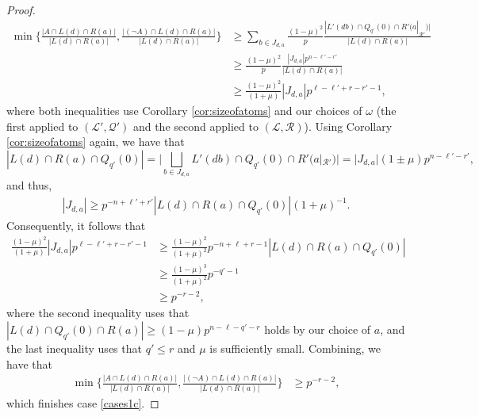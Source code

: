 \documentclass[12pt,oneside,british,a4wide]{amsart}
\numberwithin{equation}{section}
\theoremstyle{definition}
\newcommand{\calL}{\mathcal{L}}
\newcommand{\calQ}{\mathcal{Q}}
\newcommand{\calR}{\mathcal{R}}
\begin{document}
\begin{proof}
 \begin{align*}
\min\Big\{\frac{|A\cap L(d)\cap R(a)|}{|L(d)\cap R(a)|},\frac{|(\neg A)\cap L(d)\cap R(a)|}{|L(d)\cap R(a)|}\Big\}&\geq \sum_{b\in J_{d,a}}\frac{(1-\mu)^2}{p}\frac{|L'(db)\cap Q_{q'}(0)\cap R'(a|_{\calR'})|}{|L(d)\cap R(a)|}\\ 
&\geq \frac{(1-\mu)^2}{p}\frac{|J_{d,a}|p^{n-\ell'-r'}}{|L(d)\cap R(a)|}\\
&\geq  \frac{(1-\mu)^2}{(1+\mu)} |J_{d,a}|p^{\ell-\ell'+r-r'-1},
\end{align*}
where both inequalities use Corollary \ref{cor:sizeofatoms} and our choices of $\omega$ (the first applied to $(\calL',\calQ')$ and the second applied to $(\calL,\calR)$).  Using Corollary \ref{cor:sizeofatoms} again, we have that 
$$
|L(d)\cap R(a)\cap Q_{q'}(0)|=\Big|\bigsqcup_{b\in J_{d,a}}L'(db)\cap Q_{q'}(0)\cap R'(a|_{\calR'})\Big|=|J_{d,a}|(1\pm \mu)p^{n-\ell'-r'},
$$
and thus,
\begin{align*}
|J_{d,a}|\geq p^{-n+\ell'+r'}|L(d)\cap R(a)\cap Q_{q'}(0)|(1+ \mu)^{-1}.
\end{align*}
Consequently, it follows that 
\begin{align*}
\frac{(1-\mu)^2}{(1+\mu)}  |J_{d,a}|p^{\ell-\ell'+r-r'-1}&\geq \frac{(1-\mu)^2}{(1+\mu)^2} p^{-n+\ell+r-1}|L(d)\cap R(a)\cap Q_{q'}(0)|\\
&\geq \frac{(1-\mu)^3}{(1+\mu)^2} p^{-q'-1}\\
&\geq p^{-r-2},
\end{align*}
where the second inequality uses that $|L(d)\cap Q_{q'}(0)\cap R(a)|\geq (1-\mu)p^{n-\ell-q'-r}$ holds by our choice of $a$,  and the last inequality uses that $q'\leq r$ and $\mu$ is sufficiently small.  Combining, we have that
 \begin{align*}
\min\Big\{\frac{|A\cap L(d)\cap R(a)|}{|L(d)\cap R(a)|},\frac{|(\neg A)\cap L(d)\cap R(a)|}{|L(d)\cap R(a)|}\Big\}&\geq  p^{-r-2},
\end{align*} 
which finishes case \ref{cases1c}.  


\end{proof}
\end{document}
